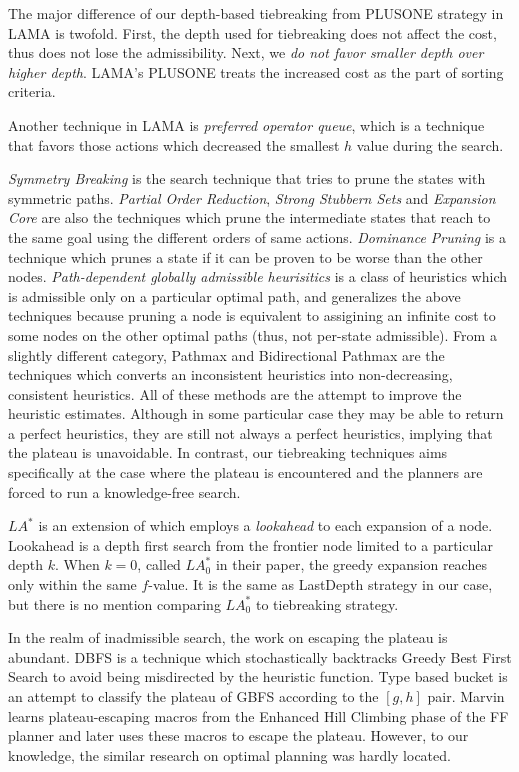 The major difference of our depth-based tiebreaking from PLUSONE
strategy in LAMA is twofold.  First, the depth used for tiebreaking does
not affect the cost, thus does not lose the admissibility. Next, we
\emph{do not favor smaller depth over higher depth}. LAMA's PLUSONE
treats the increased cost as the part of sorting criteria. 

Another technique in LAMA is \emph{preferred operator queue},
which is a technique that favors those actions which decreased the
smallest $h$ value during the search.


\emph{Symmetry Breaking}
\cite{Fox1998,pochter2011exploiting,domshlak2013symmetry} is the search
technique that tries to prune the states with symmetric
paths. \emph{Partial Order Reduction}, \emph{Strong Stubbern Sets} and
\emph{Expansion Core} are also the techniques which prune the
intermediate states that reach to the same goal using the different
orders of same actions. \emph{Dominance Pruning} \cite{hall2013faster} is a
technique which prunes a state if it can be proven to be worse than the other nodes.
% 
\emph{Path-dependent globally admissible
heurisitics} \cite{karpas2012optimal} is a class of heuristics which is
admissible only on a particular optimal path, and generalizes the above
techniques because pruning a node is equivalent to assigining an
infinite cost to some nodes on the other optimal paths (thus, not
per-state admissible).
From a slightly different category, Pathmax \cite{mero1984heuristic} and
Bidirectional Pathmax \cite{felner2011inconsistent} are the techniques
which converts an inconsistent heuristics into non-decreasing,
consistent heuristics.
All of these methods are the
attempt to improve the heuristic estimates. Although in some particular
case they may be able to return a perfect heuristics, they are still not
always a perfect heuristics, implying that the plateau is unavoidable.
In contrast, our tiebreaking techniques aims specifically at the case
where the plateau is encountered and the planners are forced to run a
knowledge-free search.

$LA^*$ \cite{stern2010look} is an extension of \astar which employs a
\emph{lookahead} to each expansion of a node. Lookahead is a depth first
search from the frontier node limited to a particular depth $k$. When
$k=0$, called $LA^*_0$ in their paper, the greedy expansion reaches only within
the same $f$-value. It is the same as LastDepth strategy in our
case, but there is no mention comparing $LA^*_0$ to tiebreaking strategy.

In the realm of inadmissible search, the work on escaping the plateau is
abundant. DBFS \cite{imai2011novel} is a technique which stochastically
backtracks Greedy Best First Search to avoid being misdirected by the
heuristic function. Type based bucket \cite{xie14type} is an attempt to
classify the plateau of GBFS according to the $[g,h]$ pair.
Marvin \cite{Coles07} learns plateau-escaping macros from the Enhanced
Hill Climbing phase of the FF planner \cite{Hoffmann01} and later uses
these macros to escape the plateau.  However, to our knowledge, the
similar research on optimal planning was hardly located.

